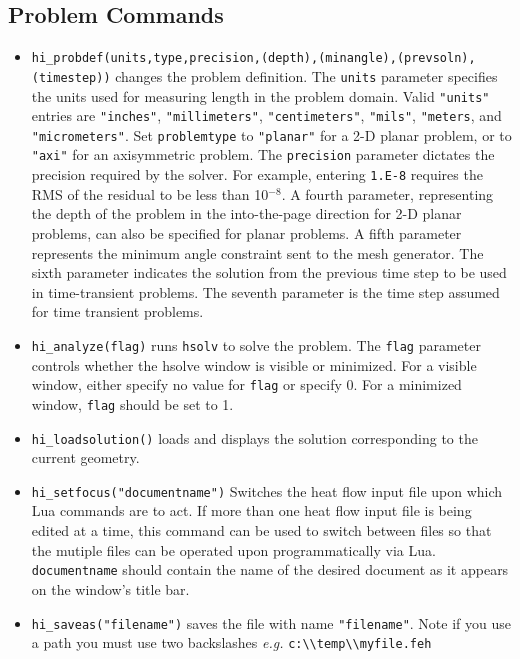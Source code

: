 \subsection{Problem Commands}

\begin{itemize}
\item {\tt hi\_probdef(units,type,precision,(depth),(minangle),(prevsoln),(timestep))} changes the problem
definition. The \texttt{units} parameter specifies the units used
for measuring length in the problem domain. Valid \texttt{"units"}
entries are
\texttt{"inches"}, \texttt{"millimeters"}, \texttt{"centimeters"},
\texttt{"mils"}, \texttt{"meters}, and \texttt{"micrometers"}. Set
\texttt{problemtype} to \texttt{"planar"} for a 2-D planar problem, or to
\texttt{"axi"} for an axisymmetric problem. The \texttt{precision} parameter
dictates the precision required by the solver. For example, entering
\texttt{1.E-8} requires the RMS of the residual to be less than 10$^{ - 8}$.
A fourth parameter, representing the depth of the problem in the
into-the-page direction for 2-D planar problems, can also be specified
for planar problems. A fifth parameter represents the minimum angle constraint sent to the mesh generator.
The sixth parameter indicates the solution from the previous time step
to be used in time-transient problems. The seventh parameter is the time step assumed
for time transient problems.

\item {\tt hi\_analyze(flag)} runs \texttt{hsolv} to solve the problem. The
\texttt{flag} parameter controls whether the hsolve window is visible or
minimized. For a visible window, either specify no value for
\texttt{flag} or specify 0. For a minimized window, \texttt{flag}
should be set to 1.

\item {\tt hi\_loadsolution()} loads and displays the solution corresponding to the
current geometry.

\item {\tt hi\_setfocus("documentname")} Switches the
heat flow input file upon which Lua commands are to act. If
more than one heat flow input file is being edited at a time,
this command can be used to switch between files so that the
mutiple files can be operated upon programmatically via Lua. {\tt
documentname} should contain the name of the desired document as
it appears on the window's title bar.

\item {\tt hi\_saveas("filename")} saves the file with name
\texttt{"filename"}. Note if you use a path you must use two backslashes
{\em e.g.} \verb+c:\\temp\\myfile.feh+

\end{itemize}

